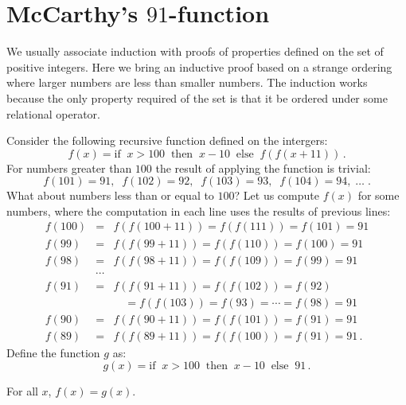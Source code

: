 \section{McCarthy's $91$-function}\label{s.induction-mccarthy}

We usually associate induction with proofs of properties defined on the set of positive integers. Here we bring an inductive proof based on a strange ordering where larger numbers are less than smaller numbers. The induction works because the only property required of the set is that it be ordered under some relational operator.

Consider the following recursive function defined on the intergers:
\[
f(x) = \textrm{if}\;\; x > 100 \;\;\textrm{then}\;\; x - 10 \;\;\textrm{else}\;\; f(f(x+11))\,.
\]
For numbers greater than $100$ the result of applying the function is trivial:
\[
f(101) = 91, \;\; f(102) = 92,\;\; f(103) = 93,\;\; f(104) = 94,\;\ldots\;.
\]
What about numbers less than or equal to $100$? Let us compute $f(x)$ for some numbers, where the computation in each line uses the results of previous lines:
\begin{eqnarray*}
f(100) &=& f(f(100+11)) = f(f(111)) = f(101) = 91\\
f(99) &=& f(f(99+11)) = f(f(110)) = f(100) = 91\\
f(98) &=& f(f(98+11)) = f(f(109)) = f(99) = 91\\
&\cdots&\\
f(91) &=& f(f(91+11)) = f(f(102)) = f(92)\\
&& \quad = f(f(103)) = f(93) = \cdots =f(98) = 91\\
f(90) &=& f(f(90+11)) = f(f(101)) = f(91) = 91\\
f(89) &=& f(f(89+11)) = f(f(100)) = f(91) = 91\,.
\end{eqnarray*}
Define the function $g$ as:
\[
g(x) = \textrm{if}\;\; x > 100 \;\;\textrm{then}\;\; x - 10 \;\;\textrm{else}\;\; 91\,.
\]

\begin{theorem}
For all $x$, $f(x) = g(x)$.
\end{theorem}

